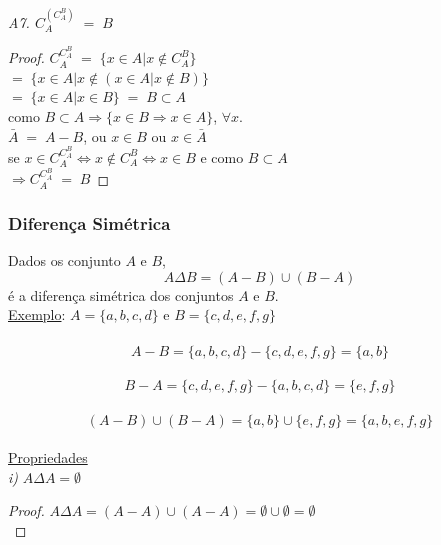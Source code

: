	\emph{A7. $ C_A^{(C_A^B)} \; = \; B $}
	\begin{proof}
		$ C_ A^{C_A^B}  \; = \; \{ x \in A | x \notin C_A^B  \}$ \\
		
		$ = \; \{ x \in A | x \notin (x \in A | x \notin B)  \} $ \\
		
		$ = \; \{ x \in A | x \in B \} \; = \; B \subset A $ \\
		
		como $ B \subset A \Rightarrow \{ x \in B \Rightarrow x \in A \}$, $ \forall x$. \\
		 
		$ \bar{A} \; = \;A - B$, ou $ x \in B$ ou $x \in \bar{A} $ \\
		
		se $ x \in C_A^{C_ A^{B}} \Leftrightarrow x \notin C_ A^B \Leftrightarrow x \in B $ e como $B \subset A$ \\
		
		$ \Rightarrow C_ A^{C_A^B} \; = \; B $
		
	\end{proof}

	\pagebreak

\subsubsection{Diferença Simétrica} 
\noindent
Dados os conjunto $A$ e $B$,
$$ A \Delta B = ( A - B ) \cup ( B - A ) $$
é a diferença simétrica dos conjuntos $A$ e $B$. \\

\noindent
\underline{Exemplo}: $ A = \{ a, b, c, d \}$ e $ B = \{ c, d, e, f, g \} $ \\ \\
$$ A - B = \{ a, b, c, d \} - \{ c, d, e, f, g \} = \{ a, b \} $$ \\
$$ B - A = \{ c, d, e, f, g \} - \{ a, b, c, d \} = \{ e, f, g \}  $$ \\
$$ ( A - B ) \cup ( B - A ) = \{ a, b \} \cup \{ e, f, g \} = \{ a, b, e, f, g  \}$$ \\

\noindent
\underline{Propriedades} \\

\noindent
\emph{i)} $ A \Delta A = \emptyset$ \\
\noindent
\begin{proof}
	$ A \Delta A = (A -A ) \cup (A - A) = \emptyset \cup \emptyset = \emptyset $ \\
\end{proof}

